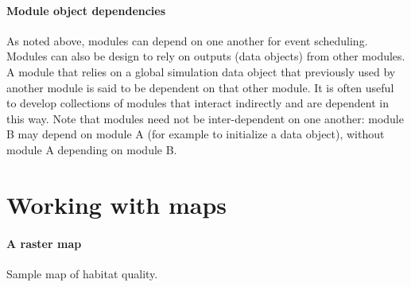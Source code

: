 \documentclass{article}
\begin{document}
\paragraph{Module object dependencies}
As noted above, modules can depend on one another for event scheduling. Modules can also be design to rely on outputs (data objects) from other modules. A module that relies on a global simulation data object that previously used by another module is said to be dependent on that other module. It is often useful to develop collections of modules that interact indirectly and are dependent in this way. Note that modules need not be inter-dependent on one another: module B may depend on module A (for example to initialize a data object), without module A depending on module B.

\newpage

\section{Working with maps}

\paragraph{A raster map}
Sample map of habitat quality.
\end{document}
